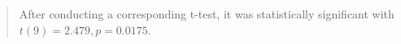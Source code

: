 \begin{quote}
After conducting a corresponding t-test, it was statistically significant with $t(9)=2.479, p=0.0175$. 
\end{quote}
